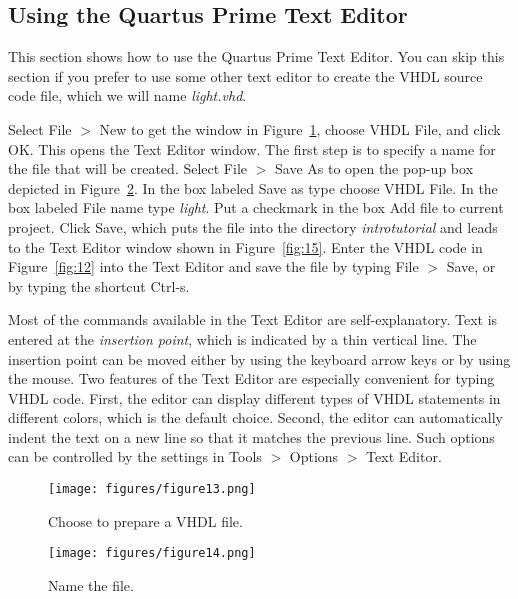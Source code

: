 \subsection{Using the Quartus Prime Text Editor}

\noindent 
This section shows how to use the Quartus Prime Text Editor.
You can skip this section if you prefer to use some other text editor
to create the VHDL source code file, which we will name {\it light.vhd}. 

Select {\sf File $>$ New} to get the window in Figure~\ref{fig:13}, 
choose {\sf VHDL File}, and click {\sf OK}. 
This opens the Text Editor window. 
The first step is to specify a name
for the file that will be created. Select {\sf File $>$ Save As}
to open the pop-up box depicted in Figure~\ref{fig:14}. 
In the box labeled {\sf Save as type} choose {\sf VHDL File}.
In the box labeled {\sf File name} type {\it light}.
Put a checkmark in the box {\sf Add file to current project}.
Click {\sf Save}, which puts the file into the directory
{\it introtutorial} and leads to the Text Editor window shown
in Figure~\ref{fig:15}. 
Enter the VHDL code in Figure~\ref{fig:12}
into the Text Editor and save the file by typing {\sf File $>$ Save}, or by typing 
the shortcut {\sf Ctrl-s}.

Most of the commands available in the Text Editor are self-explanatory. 
Text is entered at the {\it insertion point}, which is indicated by a thin
vertical line. The insertion point can be moved either by using the
keyboard arrow keys or by using the mouse. Two features of 
the Text Editor are especially convenient for typing VHDL
code. First, the editor can display different types of VHDL
statements in different colors, which is the default choice. 
Second, the editor can automatically
indent the text on a new line so that it matches the previous line. 
Such options can be controlled by the settings 
in {\sf Tools $>$ Options $>$ Text Editor}.

\begin{figure}[H]
   \begin{center}
      \texttt{[image: figures/figure13.png]}
   \caption{Choose to prepare a VHDL file.} 
	 \label{fig:13}
	 \end{center}
\end{figure}

\begin{figure}[H]
   \begin{center}
      \texttt{[image: figures/figure14.png]}
   \caption{Name the file.} 
	 \label{fig:14}
	 \end{center}
\end{figure}

